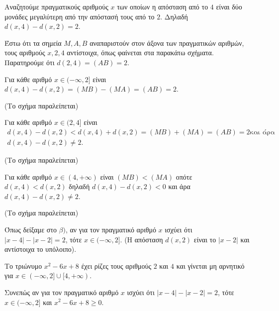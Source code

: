 
\begin{alist}
\item Αναζητούμε πραγματικούς αριθμούς $x$ των οποίων η απόσταση από το $4$ είναι
δύο μονάδες μεγαλύτερη από την απόστασή τους από το $2$. Δηλαδή
$d(x, 4) - d(x, 2) = 2$.

\item Έστω ότι τα σημεία $M, A, B$ αναπαριστούν στον άξονα των πραγματικών αριθμών,
τους αριθμούς $x, 2, 4$ αντίστοιχα, όπως φαίνεται στα παρακάτω σχήματα.
Παρατηρούμε ότι $d(2, 4) = (AB) = 2$.

Για κάθε αριθμό $x \in (-\infty, 2]$ είναι $d(x, 4) - d(x, 2) = (MB) - (MA) = (AB) = 2$.

(Το σχήμα παραλείπεται)

Για κάθε αριθμό $x \in (2, 4]$ είναι
\begin{gather*}
d(x, 4) - d(x, 2) < d(x, 4) + d(x, 2) = (MB) + (MA) = (AB) = 2\text{και άρα} \\
d(x, 4) - d(x, 2) \ne 2.
\end{gather*}

(Το σχήμα παραλείπεται)

Για κάθε αριθμό $x \in (4, +\infty)$ είναι $(MB) < (MA)$ οπότε $d(x, 4) < d(x, 2)$ δηλαδή
$d(x, 4) - d(x, 2) < 0$ και άρα $d(x, 4) - d(x, 2) \ne 2$.

(Το σχήμα παραλείπεται)

\item Όπως δείξαμε στο $\beta)$, αν για τον πραγματικό αριθμό $x$ ισχύει ότι
$|x - 4| - |x - 2| = 2$, τότε $x \in (-\infty, 2]$. (Η απόσταση $d(x, 2)$ είναι το $|x - 2|$ και αντίστοιχα το υπόλοιπο).

Το τριώνυμο $x^2 - 6x + 8$ έχει ρίζες τους αριθμούς $2$ και $4$ και γίνεται μη αρνητικό για
$x \in (-\infty, 2] \cup [4, +\infty)$.

Συνεπώς αν για τον πραγματικό αριθμό $x$ ισχύει ότι $|x - 4| - |x - 2| = 2$, τότε
$x \in (-\infty, 2]$ και $x^2 - 6x + 8 \ge 0$.
\end{alist}

